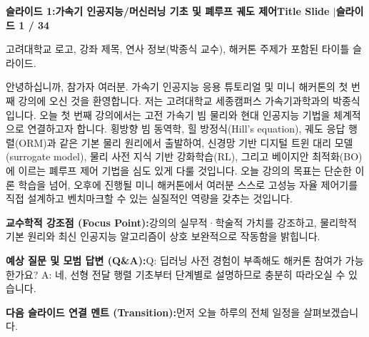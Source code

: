 \documentclass[11pt,a4paper]{article}
\begin{document}
\clearpage
{}
\setcounter{page}{1}

\clearpage
\hypertarget{slide.1}{}
{}
\noindent\begin{tcolorbox}[colback=navy,colframe=navy,left=6pt,right=6pt,top=3pt,bottom=3pt,boxrule=0pt,arc=2pt]
{\large\bfseries\color{white}슬라이드 1:\enspace 가속기 인공지능/머신러닝 기초 및 폐루프 궤도 제어}\hfill{\footnotesize\bfseries\color{white!85!lightbg}Title Slide \enspace$|$\enspace 슬라이드 1 / 34}
\end{tcolorbox}
\vspace{0.2em}
\begin{tcolorbox}[colback=lightbg,colframe=bordergray,title={\footnotesize\bfseries\color{darkgray}슬라이드 시각 구성 요약},fontupper=\small,left=6pt,right=6pt,top=2.5pt,bottom=2.5pt,boxrule=0.6pt,arc=2.5pt]
고려대학교 로고, 강좌 제목, 연사 정보(박종식 교수), 해커톤 주제가 포함된 타이틀 슬라이드.
\end{tcolorbox}
\vspace{0.2em}
\begin{tcolorbox}[colback=white,colframe=primaryblue,title={\footnotesize\bfseries\color{white}발표자 구두 대본 (Spoken Script)},fontupper=\small,left=6pt,right=6pt,top=3pt,bottom=3pt,boxrule=0.8pt,arc=2.5pt]
안녕하십니까, 참가자 여러분. 가속기 인공지능 응용 튜토리얼 및 미니 해커톤의 첫 번째 강의에 오신 것을 환영합니다. 저는 고려대학교 세종캠퍼스 가속기과학과의 박종식입니다. 오늘 첫 번째 강의에서는 고전 가속기 빔 물리와 현대 인공지능 기법을 체계적으로 연결하고자 합니다. 횡방향 빔 동역학, 힐 방정식(Hill's equation), 궤도 응답 행렬(ORM)과 같은 기본 물리 원리에서 출발하여, 신경망 기반 디지털 트윈 대리 모델(surrogate model), 물리 사전 지식 기반 강화학습(RL), 그리고 베이지안 최적화(BO)에 이르는 폐루프 제어 기법을 심도 있게 다룰 것입니다. 오늘 강의의 목표는 단순한 이론 학습을 넘어, 오후에 진행될 미니 해커톤에서 여러분 스스로 고성능 자율 제어기를 직접 설계하고 벤치마크할 수 있는 실질적인 역량을 갖추는 것입니다.
\end{tcolorbox}
\vspace{0.2em}
\begin{tcolorbox}[colback=lightbg,colframe=bordergray,left=6pt,right=6pt,top=3pt,bottom=3pt,boxrule=0.6pt,arc=2.5pt]
\small
\noindent\textbf{\color{navy}교수학적 강조점 (Focus Point):}\enspace 강의의 실무적·학술적 가치를 강조하고, 물리학적 기본 원리와 최신 인공지능 알고리즘이 상호 보완적으로 작동함을 밝힙니다.\par\vspace{0.3em}
\noindent\textbf{\color{successgreen}예상 질문 및 모범 답변 (Q\&A):}\enspace Q: 딥러닝 사전 경험이 부족해도 해커톤 참여가 가능한가요? A: 네, 선형 전달 행렬 기초부터 단계별로 설명하므로 충분히 따라오실 수 있습니다.\par\vspace{0.3em}
\noindent\textbf{\color{accent}다음 슬라이드 연결 멘트 (Transition):}\enspace 먼저 오늘 하루의 전체 일정을 살펴보겠습니다.
\end{tcolorbox}
\end{document}
